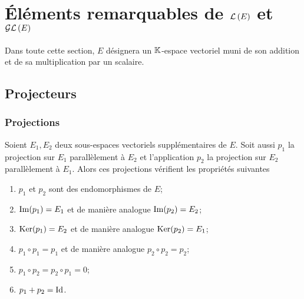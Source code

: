 \section{Éléments remarquables de \(\mathcal{L}\left(E\right)\) et \(\mathcal{GL}\left(E\right)\)}
Dans toute cette section, \(E\) désignera un \(\mathbb{K}\)-espace vectoriel muni de son addition et de sa multiplication par un scalaire.
\subsection{Projecteurs}

\subsubsection{Projections}
\label{sec:projections}


\begin{theo}\label{theo:propprojection}
  Soient \(E_1, E_2\) deux sous-espaces vectoriels supplémentaires de \(E\). Soit aussi \(p_1\) la projection sur \(E_1\) parallèlement à \(E_2\) et l'application \(p_2\) la projection sur \(E_2\) parallèlement à \(E_1\). Alors ces projections vérifient les propriétés suivantes
  \begin{enumerate}
  \item \(p_1\) et \(p_2\) sont des endomorphismes de \(E\);
  \item \(\operatorname{Im}(p_1)=E_1\) et de manière analogue \(\operatorname{Im}(p_2)=E_2\);
  \item \(\operatorname{Ker}(p_1)=E_2\) et de manière analogue \(\operatorname{Ker}(p_2)=E_1\);
  \item \(p_1 \circ p_1=p_1\) et de manière analogue \(p_2 \circ p_2=p_2\);
  \item \(p_1 \circ p_2 = p_2 \circ p_1=0\);
  \item \(p_1+p_2=\operatorname{Id}\).
  \end{enumerate}
\end{theo}

